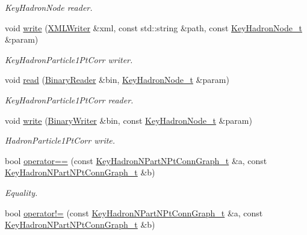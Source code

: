 \begin{DoxyCompactItemize}
\begin{DoxyCompactList}\small\item\em Key\+Hadron\+Node reader. \end{DoxyCompactList}\item 
void \mbox{\hyperlink{namespaceHadron_ab67658d0abad845f6efa3ba94de7692c}{write}} (\mbox{\hyperlink{classADATXML_1_1XMLWriter}{X\+M\+L\+Writer}} \&xml, const std\+::string \&path, const \mbox{\hyperlink{structHadron_1_1KeyHadronNode__t}{Key\+Hadron\+Node\+\_\+t}} \&param)
\begin{DoxyCompactList}\small\item\em Key\+Hadron\+Particle1\+Pt\+Corr writer. \end{DoxyCompactList}\item 
void \mbox{\hyperlink{namespaceHadron_ac376de4f56715288fc1a3eb4e0cc6725}{read}} (\mbox{\hyperlink{classADATIO_1_1BinaryReader}{Binary\+Reader}} \&bin, \mbox{\hyperlink{structHadron_1_1KeyHadronNode__t}{Key\+Hadron\+Node\+\_\+t}} \&param)
\begin{DoxyCompactList}\small\item\em Key\+Hadron\+Particle1\+Pt\+Corr reader. \end{DoxyCompactList}\item 
void \mbox{\hyperlink{namespaceHadron_a33192b7d206ee95549b4605c3db6cde8}{write}} (\mbox{\hyperlink{classADATIO_1_1BinaryWriter}{Binary\+Writer}} \&bin, const \mbox{\hyperlink{structHadron_1_1KeyHadronNode__t}{Key\+Hadron\+Node\+\_\+t}} \&param)
\begin{DoxyCompactList}\small\item\em Hadron\+Particle1\+Pt\+Corr write. \end{DoxyCompactList}\item 
bool \mbox{\hyperlink{namespaceHadron_ac884c28242a0aaf83a23169ef8ff5b2b}{operator==}} (const \mbox{\hyperlink{structHadron_1_1KeyHadronNPartNPtConnGraph__t}{Key\+Hadron\+N\+Part\+N\+Pt\+Conn\+Graph\+\_\+t}} \&a, const \mbox{\hyperlink{structHadron_1_1KeyHadronNPartNPtConnGraph__t}{Key\+Hadron\+N\+Part\+N\+Pt\+Conn\+Graph\+\_\+t}} \&b)
\begin{DoxyCompactList}\small\item\em Equality. \end{DoxyCompactList}\item 
bool \mbox{\hyperlink{namespaceHadron_aa8d535bf12152ca7f5f44d089e5db4b1}{operator!=}} (const \mbox{\hyperlink{structHadron_1_1KeyHadronNPartNPtConnGraph__t}{Key\+Hadron\+N\+Part\+N\+Pt\+Conn\+Graph\+\_\+t}} \&a, const \mbox{\hyperlink{structHadron_1_1KeyHadronNPartNPtConnGraph__t}{Key\+Hadron\+N\+Part\+N\+Pt\+Conn\+Graph\+\_\+t}} \&b)

\end{DoxyCompactItemize}
